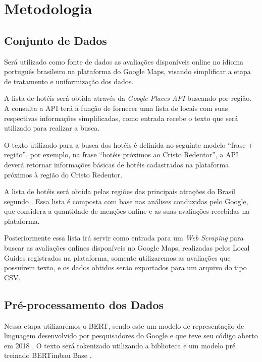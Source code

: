 \chapter{Metodologia}
\label{cap:metodologia}

\section{Conjunto de Dados}

Será utilizado como fonte de dados as avaliações disponíveis online no idioma português brasileiro na plataforma do Google Maps, visando simplificar a etapa de tratamento e uniformização dos dados.

A lista de hotéis será obtida através da \emph{Google Places API} buscando por região. A consulta a API terá a função de fornecer uma lista de locais com suas respectivas informações simplificadas, como entrada recebe o texto que será utilizado para realizar a busca.

O texto utilizado para a busca dos hotéis é definida no seguinte modelo “frase + região”, por exemplo, na frase “hotéis próximos ao Cristo Redentor”, a API deverá retornar informações básicas de hotéis cadastrados na plataforma próximos à região do Cristo Redentor.

A lista de hotéis será obtida pelas regiões das principais atrações do Brasil segundo \cite{googleFlights2022destinos}. Essa lista é composta com base nas análises conduzidas pelo Google, que considera a quantidade de menções online e as suas avaliações recebidas na plataforma.

Posteriormente essa lista irá servir como entrada para um \emph{Web Scraping} para buscar as avaliações onlines disponíveis no Google Maps, realizadas pelos Local Guides\cite{google2022localguides} registrados na plataforma, somente utilizaremos as avaliações que possuírem texto, e os dados obtidos serão exportados para um arquivo do tipo CSV.

\section{Pré-processamento dos Dados}

Nessa etapa utilizaremos o BERT, sendo este um modelo de representação de linguagem desenvolvido por pesquisadores do Google e que teve seu código aberto em 2018 \cite{hugoZanini2021mediu}. O texto será tokenizado utilizando a biblioteca e um modelo pré treinado BERTimbau Base \cite{souza2020bertimbau}.

